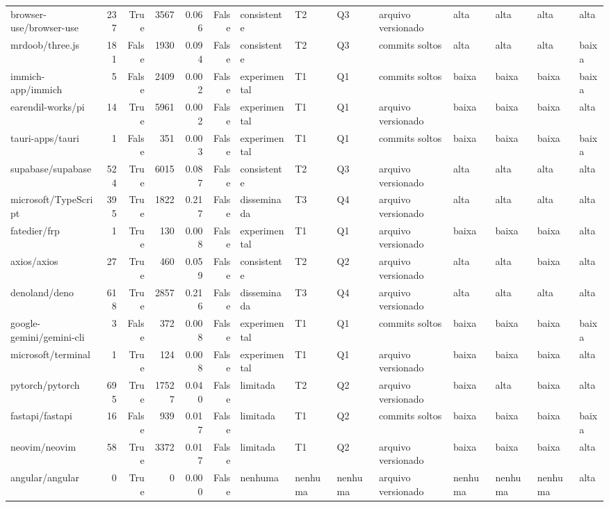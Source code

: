 \begin{tabular}{lrrrrrllllllll}
browser-use/browser-use & 237 & True & 3567 & 0.066 & False & consistente & T2 & Q3 & arquivo versionado & alta & alta & alta & alta \\
mrdoob/three.js & 181 & False & 1930 & 0.094 & False & consistente & T2 & Q3 & commits soltos & alta & alta & alta & baixa \\
immich-app/immich & 5 & False & 2409 & 0.002 & False & experimental & T1 & Q1 & commits soltos & baixa & baixa & baixa & baixa \\
earendil-works/pi & 14 & True & 5961 & 0.002 & False & experimental & T1 & Q1 & arquivo versionado & baixa & baixa & baixa & alta \\
tauri-apps/tauri & 1 & False & 351 & 0.003 & False & experimental & T1 & Q1 & commits soltos & baixa & baixa & baixa & baixa \\
supabase/supabase & 524 & True & 6015 & 0.087 & False & consistente & T2 & Q3 & arquivo versionado & alta & alta & alta & alta \\
microsoft/TypeScript & 395 & True & 1822 & 0.217 & False & disseminada & T3 & Q4 & arquivo versionado & alta & alta & alta & alta \\
fatedier/frp & 1 & True & 130 & 0.008 & False & experimental & T1 & Q1 & arquivo versionado & baixa & baixa & baixa & alta \\
axios/axios & 27 & True & 460 & 0.059 & False & consistente & T2 & Q2 & arquivo versionado & alta & alta & baixa & alta \\
denoland/deno & 618 & True & 2857 & 0.216 & False & disseminada & T3 & Q4 & arquivo versionado & alta & alta & alta & alta \\
google-gemini/gemini-cli & 3 & False & 372 & 0.008 & False & experimental & T1 & Q1 & commits soltos & baixa & baixa & baixa & baixa \\
microsoft/terminal & 1 & True & 124 & 0.008 & False & experimental & T1 & Q1 & arquivo versionado & baixa & baixa & baixa & alta \\
pytorch/pytorch & 695 & True & 17527 & 0.040 & False & limitada & T2 & Q2 & arquivo versionado & baixa & alta & baixa & alta \\
fastapi/fastapi & 16 & False & 939 & 0.017 & False & limitada & T1 & Q2 & commits soltos & baixa & baixa & baixa & baixa \\
neovim/neovim & 58 & True & 3372 & 0.017 & False & limitada & T1 & Q2 & arquivo versionado & baixa & baixa & baixa & alta \\
angular/angular & 0 & True & 0 & 0.000 & False & nenhuma & nenhuma & nenhuma & arquivo versionado & nenhuma & nenhuma & nenhuma & alta \\

\end{tabular}
